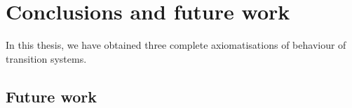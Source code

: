 \chapter{Conclusions and future work}
\label{chapterlabel4}
In this thesis, we have obtained three complete axiomatisations of behaviour of transition systems.
\section{Future work}